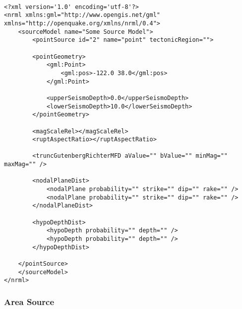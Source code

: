 \begin{Verbatim}[frame=single, commandchars=\\\{\}, fontsize=\scriptsize, samepage=true]

<?xml version='1.0' encoding='utf-8'?>
<nrml xmlns:gml="http://www.opengis.net/gml" xmlns="http://openquake.org/xmlns/nrml/0.4">
    <sourceModel name="Some Source Model">
        <pointSource id="2" name="point" tectonicRegion="">

        <pointGeometry>
            <gml:Point>
                <gml:pos>-122.0 38.0</gml:pos>
            </gml:Point>

            <upperSeismoDepth>0.0</upperSeismoDepth>
            <lowerSeismoDepth>10.0</lowerSeismoDepth>
        </pointGeometry>

        <magScaleRel></magScaleRel>
        <ruptAspectRatio></ruptAspectRatio>

        <truncGutenbergRichterMFD aValue="" bValue="" minMag="" maxMag="" />

        <nodalPlaneDist>
            <nodalPlane probability="" strike="" dip="" rake="" />
            <nodalPlane probability="" strike="" dip="" rake="" />
        </nodalPlaneDist>

        <hypoDepthDist>
            <hypoDepth probability="" depth="" />
            <hypoDepth probability="" depth="" />
        </hypoDepthDist>

    </pointSource>
    </sourceModel>
</nrml>

\end{Verbatim}


\subsubsection{Area Source}

